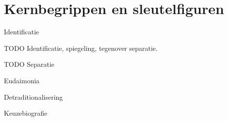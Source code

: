 \documentclass[main.tex]{subfiles}
\begin{document}
\section{Kernbegrippen en sleutelfiguren}


\begin{examenvraag}
    \begin{vraag}
        Identificatie
    \end{vraag}

    \begin{antwoord}
        TODO
        Identificatie, spiegeling, tegenover separatie.
    \end{antwoord}
\end{examenvraag}


\begin{examenvraag}
    \begin{vraag}
        TODO
        Separatie
    \end{vraag}

    \begin{antwoord}

    \end{antwoord}
\end{examenvraag}


\begin{examenvraag}
    \begin{vraag}
        Eudaimonia
    \end{vraag}

    \begin{antwoord}

    \end{antwoord}
\end{examenvraag}


\begin{examenvraag}
    \begin{vraag}
        Detraditionalisering
    \end{vraag}

    \begin{antwoord}

    \end{antwoord}
\end{examenvraag}


\begin{examenvraag}
    \begin{vraag}
        Keuzebiografie
    \end{vraag}

    \begin{antwoord}

    \end{antwoord}
\end{examenvraag}
\end{document}
